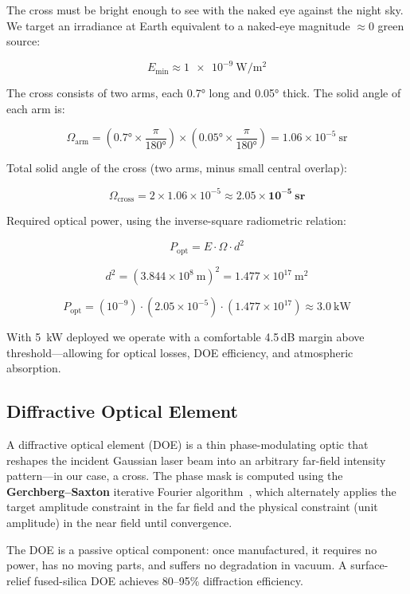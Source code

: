 \documentclass[12pt,letterpaper]{article}
\begin{document}
The cross must be bright enough to see with the naked eye against the night sky.
We target an irradiance at Earth equivalent to a naked-eye magnitude $\approx 0$
green source:

\[
  E_{\min} \approx \SI{1e-9}{\watt\per\meter\squared}
\]

The cross consists of two arms, each \ang{0.7} long and \ang{0.05} thick. The
solid angle of each arm is:

\[
  \Omega_{\text{arm}} = \left(\ang{0.7} \times \frac{\pi}{\ang{180}}\right)
                       \times \left(\ang{0.05} \times \frac{\pi}{\ang{180}}\right)
                      = 1.06 \times 10^{-5}\ \si{\steradian}
\]

Total solid angle of the cross (two arms, minus small central overlap):

\[
  \Omega_{\text{cross}} = 2 \times 1.06 \times 10^{-5}
                        \approx \mathbf{2.05 \times 10^{-5}\ \si{\steradian}}
\]

Required optical power, using the inverse-square radiometric relation:

\[
  \boxed{P_{\text{opt}} = E \cdot \Omega \cdot d^2}
\]

\[
  d^2 = \left(3.844 \times 10^8\ \si{\meter}\right)^2
       = 1.477 \times 10^{17}\ \si{\meter\squared}
\]

\[
  P_{\text{opt}} = (10^{-9})\cdot(2.05 \times 10^{-5})\cdot(1.477 \times 10^{17})
                \approx \SI{3.0}{\kilo\watt}
\]

With \SI{5}{\kilo\watt} deployed we operate with a comfortable 4.5\,dB margin
above threshold---allowing for optical losses, DOE efficiency, and atmospheric
absorption.

\subsection{Diffractive Optical Element}

A diffractive optical element (DOE) is a thin phase-modulating optic that
reshapes the incident Gaussian laser beam into an arbitrary far-field intensity
pattern---in our case, a cross. The phase mask is computed using the
\textbf{Gerchberg--Saxton} iterative Fourier algorithm~\cite{GS1972}, which
alternately applies the target amplitude constraint in the far field and the
physical constraint (unit amplitude) in the near field until convergence.

The DOE is a passive optical component: once manufactured, it requires no
power, has no moving parts, and suffers no degradation in vacuum. A
surface-relief fused-silica DOE achieves 80--95\% diffraction efficiency.
\end{document}

